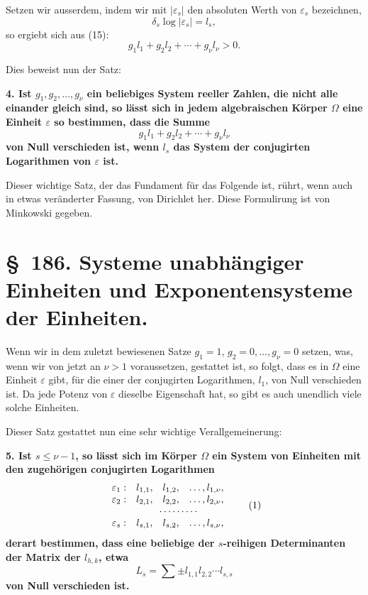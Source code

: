 \documentclass[11pt]{article}
\begin{document}
Setzen wir ausserdem, indem wir mit $|\varepsilon_s|$ den absoluten Werth von $\varepsilon_s$ bezeichnen,
\begin{equation}
\delta_s\log|\varepsilon_s|=l_s,
\tag{16}
\end{equation}
so ergiebt sich aus (15):
\begin{equation}
g_1l_1+g_2l_2+\cdots+g_\nu l_\nu>0.
\tag{17}
\end{equation}

Dies beweist nun der Satz:

\textbf{4. Ist $g_1,g_2,\ldots,g_\nu$ ein beliebiges System reeller Zahlen, die nicht alle einander gleich sind, so lässt sich in jedem algebraischen Körper $\Omega$ eine Einheit $\varepsilon$ so bestimmen, dass die Summe}
\[
g_1l_1+g_2l_2+\cdots+g_\nu l_\nu
\]
\textbf{von Null verschieden ist, wenn $l_s$ das System der conjugirten Logarithmen von $\varepsilon$ ist.}

Dieser wichtige Satz, der das Fundament für das Folgende ist, rührt, wenn auch in etwas veränderter Fassung, von Dirichlet her. Diese Formulirung ist von Minkowski gegeben.

\section*{\S~186. Systeme unabhängiger Einheiten und Exponentensysteme der Einheiten.}

Wenn wir in dem zuletzt bewiesenen Satze $g_1=1$, $g_2=0,\ldots,g_\nu=0$ setzen, was, wenn wir von jetzt an $\nu>1$ voraussetzen, gestattet ist, so folgt, dass es in $\Omega$ eine Einheit $\varepsilon$ gibt, für die einer der conjugirten Logarithmen, $l_1$, von Null verschieden ist. Da jede Potenz von $\varepsilon$ dieselbe Eigenschaft hat, so gibt es auch unendlich viele solche Einheiten.

Dieser Satz gestattet nun eine sehr wichtige Verallgemeinerung:

\textbf{5. Ist $s\leq \nu-1$, so lässt sich im Körper $\Omega$ ein System von Einheiten mit den zugehörigen conjugirten Logarithmen}
\begin{equation}
\begin{array}{cccc}
\varepsilon_1: & l_{1,1},&l_{1,2},&\ldots,l_{1,\nu},\\
\varepsilon_2: & l_{2,1},&l_{2,2},&\ldots,l_{2,\nu},\\
&\multicolumn{3}{c}{\cdots\cdots\cdots}\,\\
\varepsilon_s: & l_{s,1},&l_{s,2},&\ldots,l_{s,\nu},
\end{array}
\tag{1}
\end{equation}
\textbf{derart bestimmen, dass eine beliebige der $s$-reihigen Determinanten der Matrix der $l_{h,k}$, etwa}
\[
L_s=\sum \pm l_{1,1}l_{2,2}\cdots l_{s,s}
\]
\textbf{von Null verschieden ist.}
\end{document}
